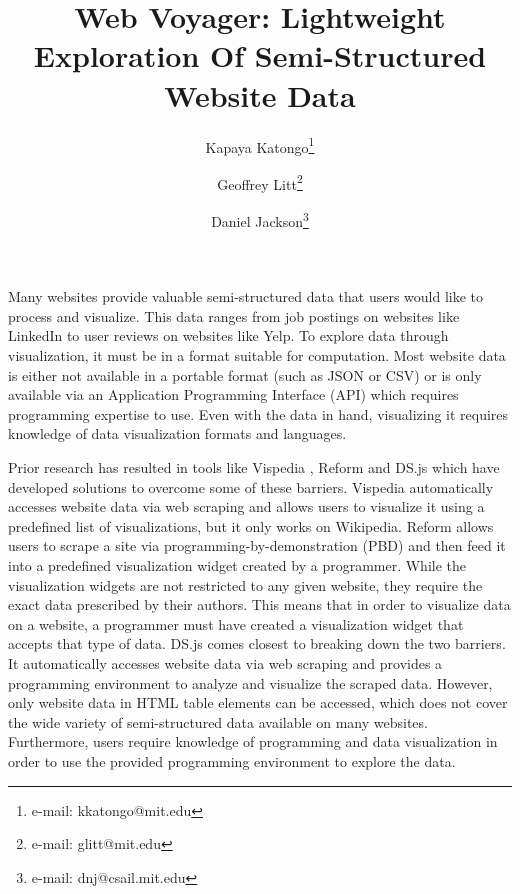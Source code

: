 \documentclass{vgtc}                          %
\title{Web Voyager: Lightweight Exploration Of Semi-Structured Website Data}
\author{Kapaya Katongo\thanks{e-mail: kkatongo@mit.edu}
\and Geoffrey Litt\thanks{e-mail: glitt@mit.edu}
\and Daniel Jackson\thanks{e-mail: dnj@csail.mit.edu}}
\affiliation{\scriptsize MIT CSAIL}
\begin{document}

\label{introduction}

\maketitle

Many websites provide valuable semi-structured data that users would like to process and visualize. This data ranges from job postings on websites like LinkedIn to user reviews on websites like Yelp. To explore data through visualization, it must be in a format suitable for computation. Most website data is either not available in a portable format (such as JSON or CSV) or is only available via an Application Programming Interface (API) which requires programming expertise to use. Even with the data in hand, visualizing it requires knowledge of data visualization formats and languages. 

Prior research has resulted in tools like Vispedia \cite{chan2008}, Reform \cite{toomim2009} and DS.js \cite{zhang2017} which have developed solutions to overcome some of these barriers. Vispedia automatically accesses website data via web scraping and allows users to visualize it using a predefined list of visualizations, but it only works on Wikipedia. Reform allows users to scrape a site via programming-by-demonstration (PBD) and then feed it into a predefined visualization widget created by a programmer. While the visualization widgets are not restricted to any given website, they require the exact data prescribed by their authors. This means that in order to visualize data on a website, a programmer must have created a visualization widget that accepts that type of data. DS.js comes closest to breaking down the two barriers. It automatically accesses website data via web scraping and provides a programming environment to analyze and visualize the scraped data. However, only website data in HTML table elements can be accessed, which does not cover the wide variety of semi-structured data available on many websites. Furthermore, users require knowledge of programming and data visualization in order to use the provided programming environment to explore the data.
\end{document}
